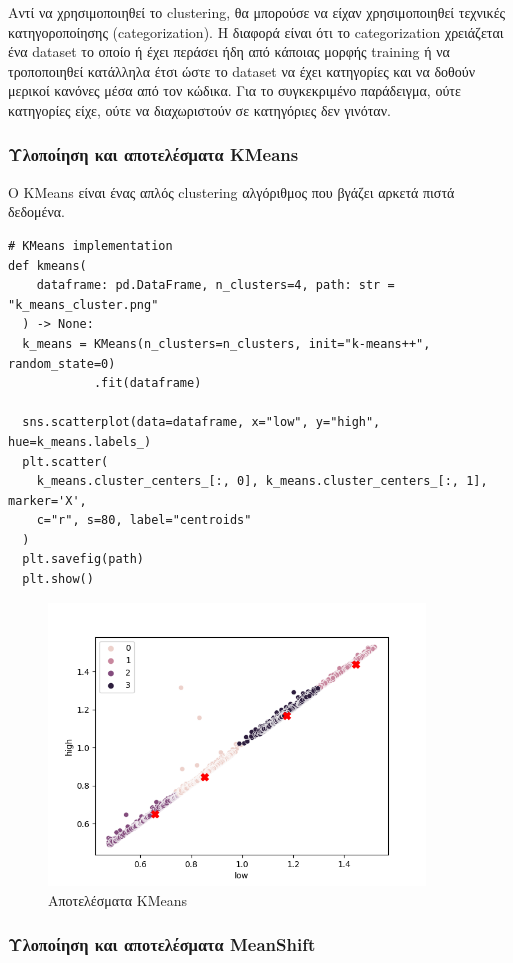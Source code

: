Αντί να χρησιμοποιηθεί το clustering, θα μπορούσε να είχαν χρησιμοποιηθεί τεχνικές κατηγοροποίησης (categorization). Η διαφορά είναι ότι το categorization χρειάζεται ένα dataset το οποίο ή έχει περάσει ήδη από κάποιας μορφής training ή να τροποποιηθεί κατάλληλα έτσι ώστε το dataset να έχει κατηγορίες και να δοθούν μερικοί κανόνες μέσα από τον κώδικα. Για το συγκεκριμένο παράδειγμα, ούτε κατηγορίες είχε, ούτε να διαχωριστούν σε κατηγόριες δεν γινόταν.

\subsubsection{Υλοποίηση και αποτελέσματα KMeans}

Ο KMeans είναι ένας απλός clustering αλγόριθμος που βγάζει αρκετά πιστά δεδομένα.

\begin{verbatim}
# KMeans implementation
def kmeans(
    dataframe: pd.DataFrame, n_clusters=4, path: str = "k_means_cluster.png"
  ) -> None:
  k_means = KMeans(n_clusters=n_clusters, init="k-means++", random_state=0)
            .fit(dataframe)

  sns.scatterplot(data=dataframe, x="low", y="high", hue=k_means.labels_)
  plt.scatter(
    k_means.cluster_centers_[:, 0], k_means.cluster_centers_[:, 1], marker='X',
    c="r", s=80, label="centroids"
  )
  plt.savefig(path)
  plt.show()
\end{verbatim}

\begin{figure}[H]
  \centering
  \includegraphics[width=100mm]{Figures/k_means_cluster.png}
  \caption{Αποτελέσματα KMeans}
  \label{fig:k_means}
\end{figure}

\subsubsection{Υλοποίηση και αποτελέσματα MeanShift}

